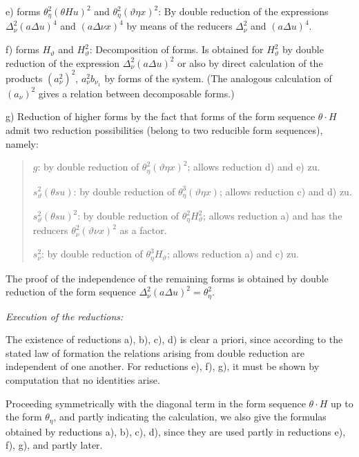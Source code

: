 \documentclass[11pt]{article}
\newcommand{\A}{\Delta}
\begin{document}
e) forms $\theta_\eta^2(\theta Hu)^2$ and $\theta_\eta^2(\vartheta\eta x)^2$: By double reduction of the expressions $\A_\nu^2(a\A u)^4$ and $(a\A\nu x)^4$ by means of the reducers $\A_\nu^2$ and $(a\A u)^4$.

f) forms $H_\vartheta$ and $H_\vartheta^2$: Decomposition of forms. Is obtained for $H_\vartheta^2$ by double reduction of the expression $\A_\nu^2(a\A u)^2$ or also by direct calculation of the products $(a_\nu^2)^2$, $a_\nu^2b_{\nu_1}$ by forms of the system. (The analogous calculation of $(a_\nu)^2$ gives a relation between decomposable forms.)

g) Reduction of higher forms by the fact that forms of the form sequence $\theta\cdot H$ admit two reduction possibilities (belong to two reducible form sequences), namely:
\begin{quote}\small
$g$: by double reduction of $\theta_\eta^2(\vartheta\eta x)^2$; allows reduction d) and e) zu.\par
$s_\vartheta^2(\theta su)$: by double reduction of $\theta_\eta^3(\vartheta\eta x)$; allows reduction c) and d) zu.\par
$s_\vartheta^2(\theta su)^2$: by double reduction of $\theta_\eta^2H_\vartheta^2$; allows reduction a) and has the reducers $\theta_\nu^2(\vartheta\nu x)^2$ as a factor.\par
$s_\nu^2$: by double reduction of $\theta_\eta^3H_\vartheta$; allows reduction a) and c) zu.
\end{quote}
The proof of the independence of the remaining forms is obtained by double reduction of the form sequence $\A_\nu^2(a\A u)^2=\theta_\eta^2$.

\noindent\emph{Execution of the reductions:}

The existence of reductions a), b), c), d) is clear a priori, since according to the stated law of formation the relations arising from double reduction are independent of one another. For reductions e), f), g), it must be shown by computation that no identities arise.

Proceeding symmetrically with the diagonal term in the form sequence $\theta\cdot H$ up to the form $\theta_\eta$, and partly indicating the calculation, we also give the formulas obtained by reductions a), b), c), d), since they are used partly in reductions e), f), g), and partly later.
\end{document}
